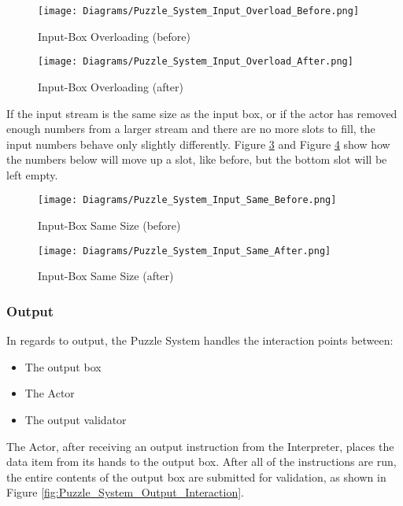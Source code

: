 \begin{figure}[!htb]
  \caption{Input-Box Overloading (before)}
  \label{fig:Puzzle_System_Input_Overload_Before}
  \centering
  \texttt{[image: Diagrams/Puzzle\_System\_Input\_Overload\_Before.png]}
\end{figure}

\begin{figure}[!htb]
  \caption{Input-Box Overloading (after)}
  \label{fig:Puzzle_System_Input_Overload_After}
  \centering
  \texttt{[image: Diagrams/Puzzle\_System\_Input\_Overload\_After.png]}
\end{figure}
\vfill
\clearpage

If the input stream is the same size as the input box, or if the actor has removed
enough numbers from a larger stream and there are no more slots to fill, the input numbers
behave only slightly differently. Figure \ref{fig:Puzzle_System_Input_Same_Before}
and Figure \ref{fig:Puzzle_System_Input_Same_After} show how the numbers below will move up a slot, like before,
but the bottom slot will be left empty.\\

\begin{figure}[!htb]
  \caption{Input-Box Same Size (before)}
  \label{fig:Puzzle_System_Input_Same_Before}
  \centering
  \texttt{[image: Diagrams/Puzzle\_System\_Input\_Same\_Before.png]}
\end{figure}

\begin{figure}[!htb]
  \caption{Input-Box Same Size (after)}
  \label{fig:Puzzle_System_Input_Same_After}
  \centering
  \texttt{[image: Diagrams/Puzzle\_System\_Input\_Same\_After.png]}
\end{figure}
\vfill
\clearpage

\subsubsection{Output}
In regards to output, the Puzzle System handles the interaction points between:
\begin{itemize}
  \item The output box
  \item The Actor
  \item The output validator
\end{itemize}
The Actor, after receiving an output instruction from the Interpreter, places the
data item from its hands to the output box. After all of the instructions are run, the
entire contents of the output box are submitted for validation, as shown in Figure
\ref{fig:Puzzle_System_Output_Interaction}.\\

